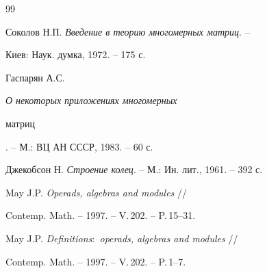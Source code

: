 \begin{thebibliography}{99}


Соколов Н.П. {\em Введение в теорию многомерных матриц}. --


Киев: Наук. думка, 1972. -- 175 с.




Гаспарян А.С. {\em О некоторых приложениях многомерных


матриц}. -- М.: ВЦ АН СССР, 1983. -- 60 с.




Джекобсон Н. {\em Строение колец}. -- М.: Ин. лит., 1961. -- 392 с.




May J.P. {\em Operads, algebras and modules} //


Contemp. Math. -- 1997. -- V.\,202. -- P.\,15--31.




May J.P. {\em Definitions$:$ operads, algebras and modules} //


Contemp. Math. -- 1997. -- V.\,202. -- P.\,1--7.





\end{thebibliography}





\vskip 2cm














\label{end}





